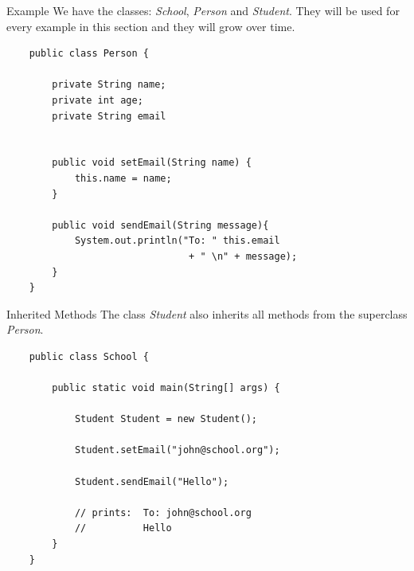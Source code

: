 \begin{frame}[fragile]{Example}
	We have the classes: \emph{School}, \emph{Person} and \emph{Student}.
	They will be used for every example in this section and they will grow over time.
	\begin{lstlisting}
	public class Person {
	
	    private String name;
	    private int age;
	    private String email
	    
    
	    public void setEmail(String name) {
	    	this.name = name;    
	    }
    
    	public void sendEmail(String message){
    		System.out.println("To: " this.email 
    							+ " \n" + message);
    	}
	}
	\end{lstlisting}
\end{frame}

\begin{frame}[fragile]{Inherited Methods}
	The class \emph{Student} also inherits all methods from the superclass \emph{Person}.
	\begin{lstlisting}
	public class School {
	
	    public static void main(String[] args) {
	    
	        Student Student = new Student();
	        
	        Student.setEmail("john@school.org");
	        
	        Student.sendEmail("Hello");
	        
	        // prints: 	To: john@school.org
	        //			Hello
	    }	
	}
	\end{lstlisting}
\end{frame}

